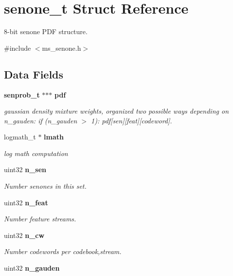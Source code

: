 \section{senone\+\_\+t Struct Reference}
\label{structsenone__t}


8-\/bit senone P\+D\+F structure.  




{\ttfamily \#include $<$ms\+\_\+senone.\+h$>$}

\subsection*{Data Fields}
\begin{DoxyCompactItemize}
\item 
{\bf senprob\+\_\+t} $\ast$$\ast$$\ast$ {\bf pdf}
\begin{DoxyCompactList}\small\item\em gaussian density mixture weights, organized two possible ways depending on n\+\_\+gauden\+: if (n\+\_\+gauden $>$ 1)\+: pdf[sen][feat][codeword]. \end{DoxyCompactList}\item 
logmath\+\_\+t $\ast$ {\bf lmath}\label{structsenone__t_aa8621fab8c5b7a13493cae5549a5e0de}

\begin{DoxyCompactList}\small\item\em log math computation \end{DoxyCompactList}\item 
uint32 {\bf n\+\_\+sen}\label{structsenone__t_a769aa6d2fc16b33c0b9a1cbf31592422}

\begin{DoxyCompactList}\small\item\em Number senones in this set. \end{DoxyCompactList}\item 
uint32 {\bf n\+\_\+feat}\label{structsenone__t_a6a0aa50b8ff66e06f7305d1c8e4a17be}

\begin{DoxyCompactList}\small\item\em Number feature streams. \end{DoxyCompactList}\item 
uint32 {\bf n\+\_\+cw}\label{structsenone__t_a3c382a37dc9cb650d910bb881c52b336}

\begin{DoxyCompactList}\small\item\em Number codewords per codebook,stream. \end{DoxyCompactList}\item 
uint32 {\bf n\+\_\+gauden}\label{structsenone__t_a71cf7b41b2334216944380296c03c99a}


\end{DoxyCompactItemize}
